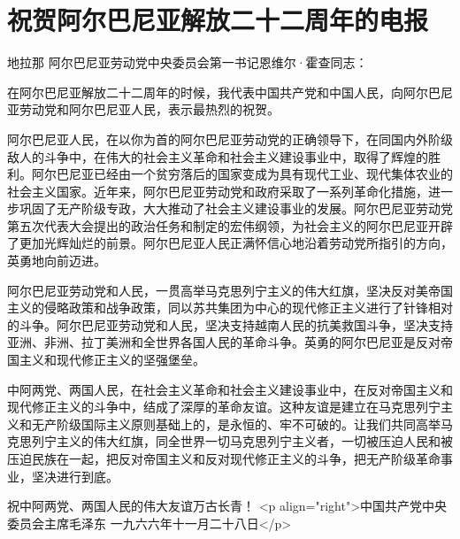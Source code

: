 \section[祝贺阿尔巴尼亚解放二十二周年的电报（一九六六年十一月二十八日）]{祝贺阿尔巴尼亚解放二十二周年的电报}


地拉那
阿尔巴尼亚劳动党中央委员会第一书记恩维尔·霍查同志：

在阿尔巴尼亚解放二十二周年的时候，我代表中国共产党和中国人民，向阿尔巴尼亚劳动党和阿尔巴尼亚人民，表示最热烈的祝贺。

阿尔巴尼亚人民，在以你为首的阿尔巴尼亚劳动党的正确领导下，在同国内外阶级敌人的斗争中，在伟大的社会主义革命和社会主义建设事业中，取得了辉煌的胜利。阿尔巴尼亚已经由一个贫穷落后的国家变成为具有现代工业、现代集体农业的社会主义国家。近年来，阿尔巴尼亚劳动党和政府采取了一系列革命化措施，进一步巩固了无产阶级专政，大大推动了社会主义建设事业的发展。阿尔巴尼亚劳动党第五次代表大会提出的政治任务和制定的宏伟纲领，为社会主义的阿尔巴尼亚开辟了更加光辉灿烂的前景。阿尔巴尼亚人民正满怀信心地沿着劳动党所指引的方向，英勇地向前迈进。

阿尔巴尼亚劳动党和人民，一贯高举马克思列宁主义的伟大红旗，坚决反对美帝国主义的侵略政策和战争政策，同以苏共集团为中心的现代修正主义进行了针锋相对的斗争。阿尔巴尼亚劳动党和人民，坚决支持越南人民的抗美救国斗争，坚决支持亚洲、非洲、拉丁美洲和全世界各国人民的革命斗争。英勇的阿尔巴尼亚是反对帝国主义和现代修正主义的坚强堡垒。

中阿两党、两国人民，在社会主义革命和社会主义建设事业中，在反对帝国主义和现代修正主义的斗争中，结成了深厚的革命友谊。这种友谊是建立在马克思列宁主义和无产阶级国际主义原则基础上的，是永恒的、牢不可破的。让我们共同高举马克思列宁主义的伟大红旗，同全世界一切马克思列宁主义者，一切被压迫人民和被压迫民族在一起，把反对帝国主义和反对现代修正主义的斗争，把无产阶级革命事业，坚决进行到底。

祝中阿两党、两国人民的伟大友谊万古长青！
<p align="right">中国共产党中央委员会主席毛泽东
一九六六年十一月二十八日</p>


